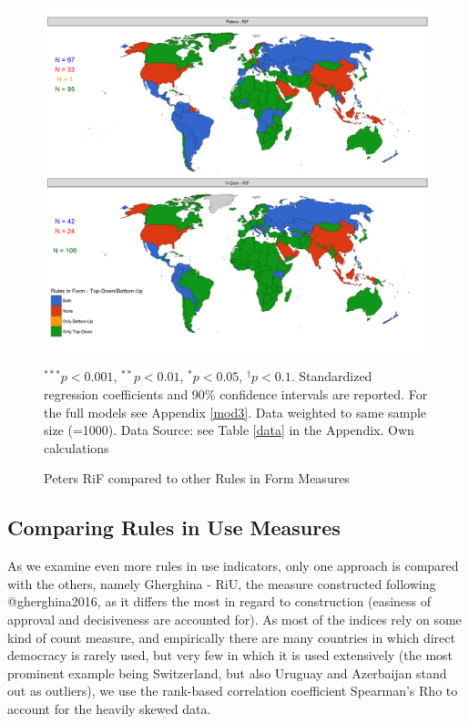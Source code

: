 \documentclass{systats}
\begin{document}
\begin{figure}
\caption{Peters RiF compared to other Rules in Form Measures}
\label{reg2}
\includegraphics[width=\textwidth]{images/map_rif.png}
\flushright
{\scriptsize $^{***}p<0.001$, $^{**}p<0.01$, $^*p<0.05$, $^{\dagger}p<0.1$. Standardized regression coefficients and 90\% confidence intervals are reported. For the full models see Appendix \ref{mod3}. Data weighted to same sample size (=1000). Data Source: see Table \ref{data} in the Appendix. Own calculations  \par}
\end{figure}



\subsection{Comparing Rules in Use Measures}




As we examine even more rules in use indicators, only one approach is compared with the others, namely Gherghina - RiU, the measure constructed following @gherghina2016, as it differs the most in regard to construction (easiness of approval and decisiveness are accounted for). As most of the indices rely on some kind of count measure, and empirically there are many countries in which direct democracy is rarely used, but very few in which it is used extensively (the most prominent example being Switzerland, but also Uruguay and Azerbaijan stand out as outliers), we use the rank-based correlation coefficient Spearman’s Rho to account for the heavily skewed data. 
\end{document}
